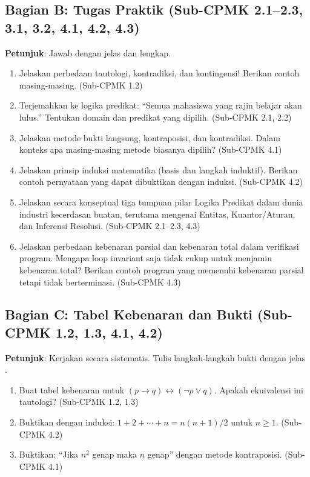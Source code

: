 \subsection{Bagian B: Tugas Praktik (Sub-CPMK 2.1--2.3, 3.1, 3.2, 4.1, 4.2, 4.3)}

\textbf{Petunjuk}: Jawab dengan jelas dan lengkap.

\begin{enumerate}
  \item Jelaskan perbedaan tautologi, kontradiksi, dan kontingensi! Berikan contoh masing-masing. (Sub-CPMK 1.2)
  \item Terjemahkan ke logika predikat: ``Semua mahasiswa yang rajin belajar akan lulus.'' Tentukan domain dan predikat yang dipilih. (Sub-CPMK 2.1, 2.2)
  \item Jelaskan metode bukti langsung, kontraposisi, dan kontradiksi. Dalam konteks apa masing-masing metode biasanya dipilih? (Sub-CPMK 4.1)
  \item Jelaskan prinsip induksi matematika (basis dan langkah induktif). Berikan contoh pernyataan yang dapat dibuktikan dengan induksi. (Sub-CPMK 4.2)
  \item Jelaskan secara konseptual tiga tumpuan pilar Logika Predikat dalam dunia industri kecerdasan buatan, terutama mengenai Entitas, Kuantor/Aturan, dan Inferensi Resolusi. (Sub-CPMK 2.1--2.3, 4.3)
  \item Jelaskan perbedaan kebenaran parsial dan kebenaran total dalam verifikasi program. Mengapa loop invariant saja tidak cukup untuk menjamin kebenaran total? Berikan contoh program yang memenuhi kebenaran parsial tetapi tidak berterminasi. (Sub-CPMK 4.3)
\end{enumerate}

\subsection{Bagian C: Tabel Kebenaran dan Bukti (Sub-CPMK 1.2, 1.3, 4.1, 4.2)}

\textbf{Petunjuk}: Kerjakan secara sistematis. Tulis langkah-langkah bukti dengan jelas \cite{forallx,hammack2018}.

\begin{enumerate}
  \item Buat tabel kebenaran untuk $(p \rightarrow q) \leftrightarrow (\neg p \vee q)$. Apakah ekuivalensi ini tautologi? (Sub-CPMK 1.2, 1.3)
  \item Buktikan dengan induksi: $1 + 2 + \cdots + n = n(n+1)/2$ untuk $n \geq 1$. (Sub-CPMK 4.2)
  \item Buktikan: ``Jika $n^2$ genap maka $n$ genap'' dengan metode kontraposisi. (Sub-CPMK 4.1)
\end{enumerate}

